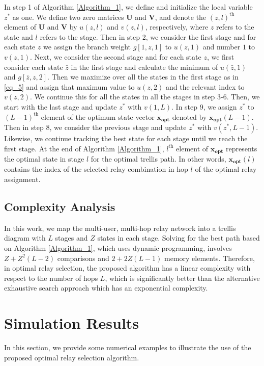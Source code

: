 \documentclass[12pt,draftclsnofoot,onecolumn]{IEEEtran}
\begin{document}
	In step 1 of Algorithm \ref{Algorithm_1}, we define and initialize the local variable $z^*$ as one. We define two zero matrices $\mathbf{U}$ and $\mathbf{V}$, and denote the $(z,l)^{\textrm{th}}$ element of $\mathbf{U}$ and $\mathbf{V}$ by $u(z,l)$ and $v(z,l)$, respectively, where $z$ refers to the state and $l$ refers to the stage.
	Then in step 2, we consider the first stage and for each state $z$ we assign the branch weight $g[1,z,1]$ to $u(z,1)$ and number $1$ to $v(z,1)$. Next, we consider the second stage and for each state $z$, we first consider each state $\bar{z}$ in the first stage and calculate the minimum of $u(\bar{z},1)$ and $g[\bar{z},z,2]$. Then we maximize over all the states in the first stage as in \eqref{eq_5} and assign that maximum value to $u(z,2)$ and the relevant index to $v(z,2)$. We continue this for all the states in all the stages in step 3-6. Then, we start with the last stage and update $z^*$ with $v(1,L)$. In step 9, we assign $z^*$ to $(L-1)^{\textrm{th}}$ element of the optimum state vector $\mathbf{x_{opt}}$ denoted by $\mathbf{x_{opt}}(L-1)$. Then in step 8, we consider the previous stage and update $z^*$ with $v(z^*,L-1)$. Likewise, we continue tracking the best state for each stage until we reach the first stage. At the end of Algorithm \ref{Algorithm_1}, $l^{\textrm{th}}$ element of $\mathbf{x_{opt}}$ represents the optimal state in stage $l$ for the optimal trellis path. In other words, $\mathbf{x_{opt}}(l)$ contains the index of the selected relay combination in hop $l$ of the optimal relay assignment. 
	
	\subsection{Complexity Analysis}\label{Sec-complex} 
	In this work, we map the multi-user, multi-hop relay network into a trellis diagram with $L$ stages and $Z$ states in each stage. Solving for the best path based on Algorithm \ref{Algorithm_1}, which uses dynamic programming, involves $Z+Z^2(L-2)$ comparisons and $2+2Z(L-1)$ memory elements. Therefore, in optimal relay selection, the proposed algorithm has a linear complexity with respect to the number of hops $L$, which is significantly better than the alternative exhaustive search approach which has an exponential complexity.	
	
	\section{Simulation Results}\label{Sec-sim}
	In this section, we provide some numerical examples to illustrate the use of the proposed optimal relay selection algorithm. 
	
\end{document}
